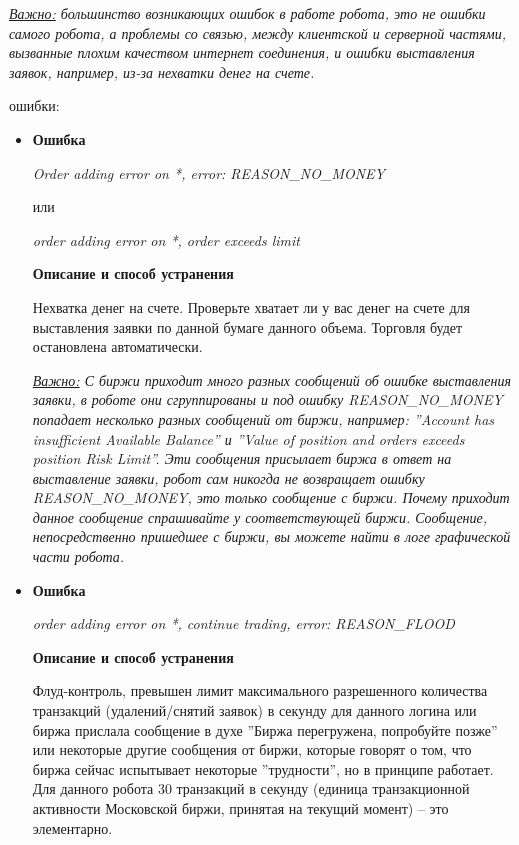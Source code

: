 \label{errors}

\textit{\underline{Важно:} большинство возникающих ошибок в работе робота, это не ошибки самого робота, а проблемы со связью, между клиентской и серверной частями, вызванные
плохим качеством интернет соединения, и ошибки выставления заявок, например, из-за нехватки денег на счете.}\newline

 ошибки:

\begin{itemize}
\item \textbf{Ошибка}

\textit{Order adding error on *, error: REASON\_NO\_MONEY}

или

\textit{order adding error on *, order exceeds limit}

\textbf{Описание и способ устранения}

Нехватка денег на счете. Проверьте хватает ли у вас денег на счете для выставления заявки по данной бумаге данного объема. Торговля будет остановлена автоматически.

\textit{\underline{Важно:} С биржи приходит много разных сообщений об ошибке выставления заявки, в роботе они сгруппированы и под ошибку REASON\_NO\_MONEY попадает
несколько разных сообщений от биржи, например: ''Account has insufficient Available Balance'' и ''Value of position and orders exceeds position Risk Limit''. Эти сообщения
присылает биржа в ответ на выставление заявки, робот сам никогда не возвращает ошибку REASON\_NO\_MONEY, это только сообщение с биржи. Почему приходит данное
сообщение спрашивайте у соответствующей биржи. Сообщение, непосредственно пришедшее с биржи, вы можете найти в логе графической части робота.}

\item \textbf{Ошибка}

\textit{order adding error on *, continue trading, error: REASON\_FLOOD}

\textbf{Описание и способ устранения}

Флуд-контроль, превышен лимит максимального разрешенного количества транзакций (удалений/снятий заявок) в секунду для данного логина или биржа прислала сообщение
в духе ''Биржа перегружена, попробуйте позже'' или некоторые другие сообщения от биржи, которые говорят о том, что биржа сейчас испытывает некоторые ''трудности'',
но в принципе работает. Для данного робота $30$ транзакций в
секунду (единица транзакционной активности Московской биржи, принятая на текущий момент) -- это элементарно.


\end{itemize}
